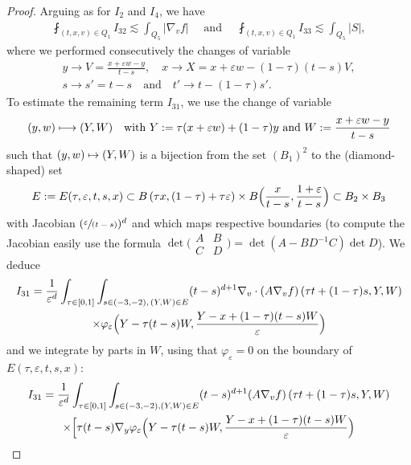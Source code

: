 \documentclass[JEP,XML,SOM,Unicode,NoFloatCountersInSection,published]{cedram}
\def\mto{\mathchoice{\longmapsto}{\mapsto}{\mapsto}{\mapsto}}
\newcommand{\spfrac}[2]{\sfrac{#1}{(#2)}}
\theoremstyle{definition}
\theoremstyle{remark}
\let\var\varepsilon
\begin{document}
\begin{proof}
Arguing as for $I_2$ and $I_4$, we have
\begin{align}
\label{estim I323}
\fint_{(t,x,v) \in Q_1} I_{32} \lesssim \int_{Q_5} \left|
\nabla_v f\right| \quad \text{ and } \quad
\fint_{(t,x,v) \in Q_1} I_{33} \lesssim \int_{Q_5} |S|,
\end{align}
where we performed consecutively the changes of variable
\begin{gather*}
y\to V=\frac{x+\varepsilon w-y}{t-s},\quad
x\to X= x+\varepsilon w -(1-\tau)(t-s)V,\\
s\to s'=t-s\quad \text{and}\quad t'\to t-(1-\tau)s'.
\end{gather*}
To estimate the remaining term $I_{31}$, we use the change of
variable
\begin{equation}
\label{eq:change-variables}
(y,w) \mto (Y,W) \quad \text{with }
Y:=\tau (x+\varepsilon w)+(1-\tau)y \text{ and } W:=\frac{x+\varepsilon w -y}{t-s}
\end{equation}
such that $(y,w)\mto (Y,W)$ is a bijection from the set
$(B_1)^2$ to the (diamond-shaped) set
\begin{equation*}
E:=E(\tau,\varepsilon,t,s,x) \subset B\left(\tau x, (1-\tau)
+ \tau \var\right)
\times B\Bigl(\frac{x}{t-s},\frac{1+\var}{t-s}\Bigr)
\subset B_2 \times B_3
\end{equation*}
with Jacobian $(\spfrac{\var}{t-s})^d$ and which maps
respective boundaries (to compute the Jacobian easily use the
formula
$\det \bigl( \begin{smallmatrix} A & B \\ C & D \end{smallmatrix}\bigr) =
\det(A - B D^{-1} C) \det D$). We deduce
\begin{multline*}
I_{31} = \frac{1}{\varepsilon^d} \int_{\tau\in
[0,1]}\int_{s\in (-3,-2), \, (Y,W)\in E}
(t-s)^{d+1}\nabla_v\cdot (A
\nabla_v f)\left(\tau
t+(1-\tau)s,Y,W\right)\\
\times \varphi_{\varepsilon} \Bigl(Y-\tau
(t-s)W,\frac{Y-x+(1-\tau)(t-s)W}{\varepsilon} \Bigr)
\end{multline*}
and we integrate by parts in $W$, using that $\varphi_\var=0$
on the boundary of $E(\tau,\var,t,s,x)$:
\begin{multline*}
I_{31}=
\frac{1}{\varepsilon^d}\int_{\tau \in
[0,1]}\int_{s\in (-3,-2), (Y,W)\in E} (t-s)^{d+1}(A \nabla_v
f)\left(\tau t+(1-\tau)s,Y,W\right) \\
\times \Bigl[\tau (t-s)\nabla_y\varphi_\var
\Bigl(Y - \tau (t-s)W,\frac{Y-x+(1-\tau)(t-s)W}{\varepsilon}
\Bigr)\\

\end{multline*}
\end{proof}
\end{document}
